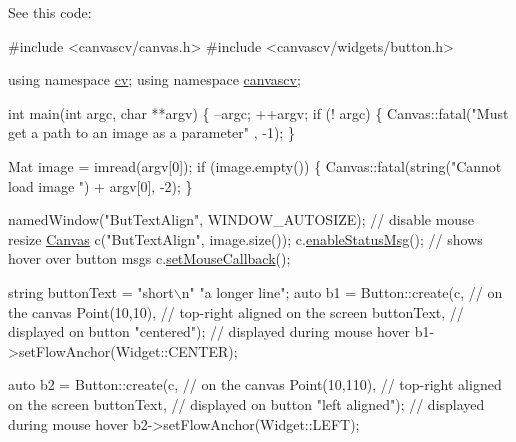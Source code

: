 See this code\+: 
\begin{DoxyCode}
\textcolor{preprocessor}{#include <canvascv/canvas.h>}
\textcolor{preprocessor}{#include <canvascv/widgets/button.h>}

\textcolor{keyword}{using namespace }\hyperlink{namespacecv}{cv};
\textcolor{keyword}{using namespace }\hyperlink{namespacecanvascv}{canvascv};

\textcolor{keywordtype}{int} main(\textcolor{keywordtype}{int} argc, \textcolor{keywordtype}{char} **argv)
\{
    --argc;
    ++argv;
    \textcolor{keywordflow}{if} (! argc)
    \{
        Canvas::fatal(\textcolor{stringliteral}{"Must get a path to an image as a parameter"} , -1);
    \}

    Mat image = imread(argv[0]);
    \textcolor{keywordflow}{if} (image.empty())
    \{
        Canvas::fatal(\textcolor{keywordtype}{string}(\textcolor{stringliteral}{"Cannot load image "}) + argv[0], -2);
    \}

    namedWindow(\textcolor{stringliteral}{"ButTextAlign"}, WINDOW\_AUTOSIZE); \textcolor{comment}{// disable mouse resize}
    \hyperlink{classcanvascv_1_1Canvas}{Canvas} c(\textcolor{stringliteral}{"ButTextAlign"}, image.size());
    c.\hyperlink{classcanvascv_1_1Canvas_a402c43a42c0089c48a96e5303c1c1fe8}{enableStatusMsg}(); \textcolor{comment}{// shows hover over button msgs}
    c.\hyperlink{classcanvascv_1_1Canvas_acf6e5d4b40aec610b0dc8c4f6bf93ac1}{setMouseCallback}();

    \textcolor{keywordtype}{string} buttonText = \textcolor{stringliteral}{"short\(\backslash\)n"}
                        \textcolor{stringliteral}{"a longer line"};
    \textcolor{keyword}{auto} b1 = Button::create(c,               \textcolor{comment}{// on the canvas}
                             Point(10,10),    \textcolor{comment}{// top-right aligned on the screen}
                             buttonText,      \textcolor{comment}{// displayed on button}
                             \textcolor{stringliteral}{"centered"});     \textcolor{comment}{// displayed during mouse hover}
    b1->setFlowAnchor(Widget::CENTER);

    \textcolor{keyword}{auto} b2 = Button::create(c,               \textcolor{comment}{// on the canvas}
                             Point(10,110),    \textcolor{comment}{// top-right aligned on the screen}
                             buttonText,      \textcolor{comment}{// displayed on button}
                             \textcolor{stringliteral}{"left aligned"}); \textcolor{comment}{// displayed during mouse hover}
    b2->setFlowAnchor(Widget::LEFT);


\end{DoxyCode}
